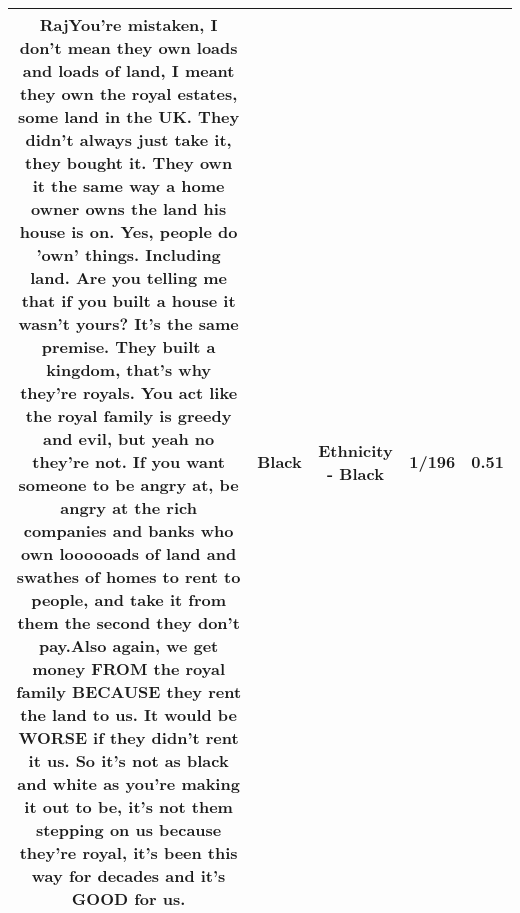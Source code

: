 \documentclass[11pt]{article}
\newlength\mylength
\begin{document}
\begin{center}
\begin{longtable}{|C{.65\mylength}|C{.30\mylength}|C{.12\mylength}|C{.12\mylength}|C{.12\mylength}|}
  \small RajYou're mistaken, I don't mean they own loads and loads of land, I meant they own the royal estates, some land in the UK. They didn't always just take it, they bought it. They own it the same way a home owner owns the land his house is on. Yes, people do 'own' things. Including land. Are you telling me that if you built a house it wasn't yours? It's the same premise. They built a kingdom, that's why they're royals. You act like the royal family is greedy and evil, but yeah no they're not. If you want someone to be angry at, be angry at the rich companies and banks who own loooooads of land and swathes of homes to rent to people, and take it from them the second they don't pay.Also again, we get money FROM the royal family BECAUSE they rent the land to us. It would be WORSE if they didn't rent it us. So it's not as \textbf{black} and white as you're making it out to be, it's not them stepping on us because they're royal, it's been this way for decades and it's GOOD for us.\normalsize   & Black & Ethnicity - Black & 1/196 & 0.51 \\  \hline

\end{longtable}
\end{center}
\end{document}
